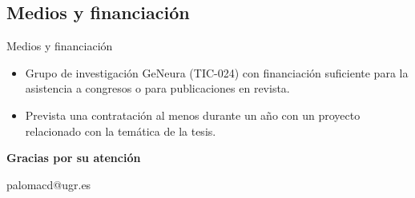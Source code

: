 \documentclass{beamer}
\begin{document}
\subsection{Medios y financiación}

\begin{frame}{Medios y financiación}

\begin{itemize}
  \item Grupo de investigación GeNeura (TIC-024) con financiación suficiente para la asistencia a congresos o para publicaciones en revista.
  \item Prevista una contratación al menos durante un año con un proyecto relacionado con la temática de la tesis.
\end{itemize}

\end{frame}

\begin{frame}
  \begin{center}
  {\large \textbf{Gracias por su atención}}
  
  palomacd@ugr.es
  \end{center}
\end{frame}
\end{document}
